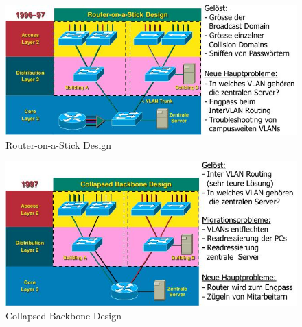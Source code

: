 \documentclass[ngerman,a4paper,12pt]{scrreprt}
\begin{document}
\begin{figure}[H]
	\centering
	 \includegraphics[width=\textwidth]{img/V5.10.jpg}
	\caption{Router-on-a-Stick Design}
	\label{}
\end{figure}

\begin{figure}[H]
	\centering
	 \includegraphics[width=\textwidth]{img/V5.11.jpg}
	\caption{Collapsed Backbone Design}
	\label{}
\end{figure}
\end{document}
